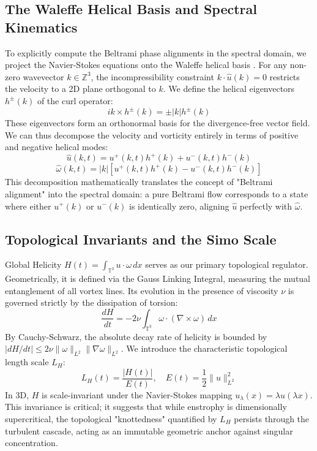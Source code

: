 \documentclass[12pt,a4paper]{article}
\theoremstyle{plain}
\theoremstyle{definition}
\theoremstyle{remark}
\begin{document}
\subsection{The Waleffe Helical Basis and Spectral Kinematics}
To explicitly compute the Beltrami phase alignments in the spectral domain, we project the Navier-Stokes equations onto the Waleffe helical basis \cite{waleffe1992}. For any non-zero wavevector $k \in \mathbb{Z}^3$, the incompressibility constraint $k \cdot \hat{u}(k) = 0$ restricts the velocity to a 2D plane orthogonal to $k$. We define the helical eigenvectors $h^\pm(k)$ of the curl operator:
\begin{equation}
    i k \times h^\pm(k) = \pm |k| h^\pm(k)
\end{equation}
These eigenvectors form an orthonormal basis for the divergence-free vector field. We can thus decompose the velocity and vorticity entirely in terms of positive and negative helical modes:
\begin{equation}
    \hat{u}(k,t) = u^+(k,t) h^+(k) + u^-(k,t) h^-(k)
\end{equation}
\begin{equation}
    \hat{\omega}(k,t) = |k| \left[ u^+(k,t) h^+(k) - u^-(k,t) h^-(k) \right]
\end{equation}
This decomposition mathematically translates the concept of "Beltrami alignment" into the spectral domain: a pure Beltrami flow corresponds to a state where either $u^+(k)$ or $u^-(k)$ is identically zero, aligning $\hat{u}$ perfectly with $\hat{\omega}$.

\subsection{Topological Invariants and the Simo Scale}
Global Helicity $H(t) = \int_{\mathbb{T}^3} u \cdot \omega \, dx$ serves as our primary topological regulator. Geometrically, it is defined via the Gauss Linking Integral, measuring the mutual entanglement of all vortex lines. Its evolution in the presence of viscosity $\nu$ is governed strictly by the dissipation of torsion:
\begin{equation}
    \frac{dH}{dt} = -2\nu \int_{\mathbb{T}^3} \omega \cdot (\nabla \times \omega) \, dx
\end{equation}
By Cauchy-Schwarz, the absolute decay rate of helicity is bounded by $|dH/dt| \leq 2\nu \|\omega\|_{L^2} \|\nabla \omega\|_{L^2}$.
We introduce the characteristic topological length scale $L_H$:
\begin{equation}
    L_H(t) = \frac{|H(t)|}{E(t)}, \quad E(t) = \frac{1}{2}\|u\|_{L^2}^2
\end{equation}
In 3D, $H$ is scale-invariant under the Navier-Stokes mapping $u_\lambda(x) = \lambda u(\lambda x)$. This invariance is critical; it suggests that while enstrophy is dimensionally supercritical, the topological "knottedness" quantified by $L_H$ persists through the turbulent cascade, acting as an immutable geometric anchor against singular concentration.
\end{document}
